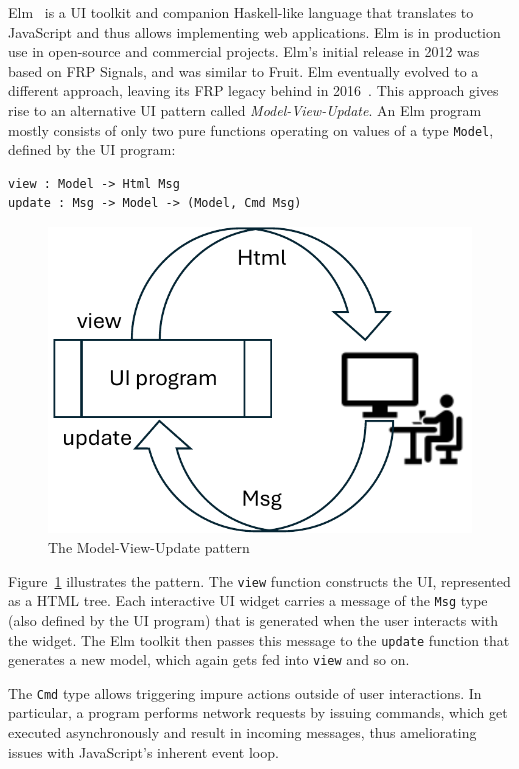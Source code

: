 \documentclass[sigplan,screen]{acmart}
\begin{document}
Elm~\cite{Elm} is a UI toolkit and companion Haskell-like language
that translates to JavaScript and thus allows implementing web
applications.  Elm is in production use in open-source and
commercial projects.  Elm's initial release in 2012 was based on FRP Signals,
and was similar to Fruit.  
Elm eventually evolved to a different approach,
leaving its FRP legacy behind in 2016~\cite{ElmFarewellFRP}.  This approach
gives rise to an alternative UI pattern called
\textit{Model-View-Update}.  An Elm program mostly consists of only
two pure functions operating on values of a type \texttt{Model},
defined by the UI program:
%
\begin{verbatim}
view : Model -> Html Msg
update : Msg -> Model -> (Model, Cmd Msg)
\end{verbatim}
%
\begin{figure}
  \centering
  \includegraphics[width=0.6\columnwidth]{model-view-update}
  \caption{The Model-View-Update pattern}
  \label{fig:mvu}
\end{figure}
%
Figure~\ref{fig:mvu} illustrates the pattern.
The \texttt{view} function constructs the UI, represented as a HTML
tree.  Each interactive UI widget carries a message of the
\texttt{Msg} type (also defined by the UI program) that is generated
when the user interacts with the widget.  The Elm toolkit then passes
this message to the \texttt{update} function that generates a new
model, which again gets fed into \texttt{view} and so on.

The \texttt{Cmd} type allows triggering impure actions outside of user
interactions.  In particular, a program performs network requests by
issuing commands, which get executed asynchronously and result in
incoming messages, thus ameliorating issues with JavaScript's
inherent event loop.
\end{document}
